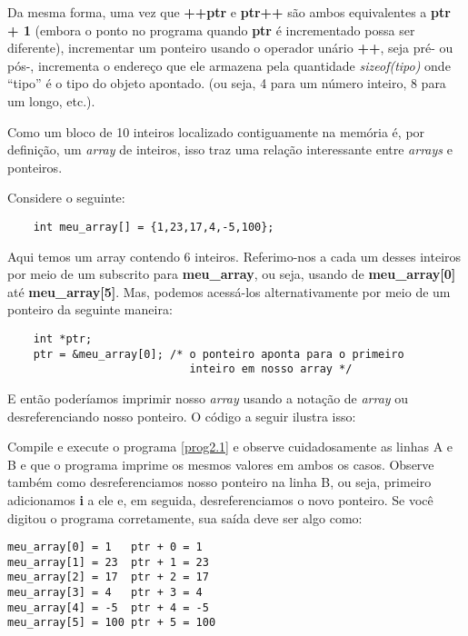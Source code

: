 Da mesma forma, uma vez que \textbf{++ptr} e \textbf{ptr++} são ambos equivalentes a \textbf{ptr + 1} (embora o ponto no programa quando \textbf{ptr} é incrementado possa ser diferente), incrementar um ponteiro usando o operador unário \textbf{++}, seja pré- ou pós-, incrementa o endereço que ele armazena pela quantidade \textit{sizeof(tipo)} onde ``tipo'' é o tipo do objeto apontado. (ou seja, 4 para um número inteiro, 8 para um longo, etc.).

Como um bloco de 10 inteiros localizado contiguamente na memória é, por definição, um \textit{array} de inteiros, isso traz uma relação interessante entre \textit{arrays} e ponteiros.

Considere o seguinte:
\begin{lstlisting}
	int meu_array[] = {1,23,17,4,-5,100};
\end{lstlisting}

Aqui temos um array contendo 6 inteiros. Referimo-nos a cada um desses inteiros por meio de um subscrito para \textbf{meu\_array}, ou seja, usando de \textbf{meu\_array[0]} até \textbf{meu\_array[5]}. Mas, podemos acessá-los alternativamente por meio de um ponteiro da seguinte maneira:

\begin{lstlisting}
	int *ptr;
	ptr = &meu_array[0]; /* o ponteiro aponta para o primeiro
	                        inteiro em nosso array */
\end{lstlisting}

E então poderíamos imprimir nosso \textit{array} usando a notação de \textit{array} ou desreferenciando nosso ponteiro. O código a seguir ilustra isso:



Compile e execute o programa \ref{prog2.1} e observe cuidadosamente as linhas A e B e que o programa imprime os mesmos valores em ambos os casos. Observe também como desreferenciamos nosso ponteiro na linha B, ou seja, primeiro adicionamos \textbf{i} a ele e, em seguida, desreferenciamos o novo ponteiro.
Se você digitou o programa corretamente, sua saída deve ser algo como:
\lstconsolestyle
\begin{lstlisting}
meu_array[0] = 1   ptr + 0 = 1
meu_array[1] = 23  ptr + 1 = 23
meu_array[2] = 17  ptr + 2 = 17
meu_array[3] = 4   ptr + 3 = 4
meu_array[4] = -5  ptr + 4 = -5
meu_array[5] = 100 ptr + 5 = 100
\end{lstlisting}
\lstcodestyle

